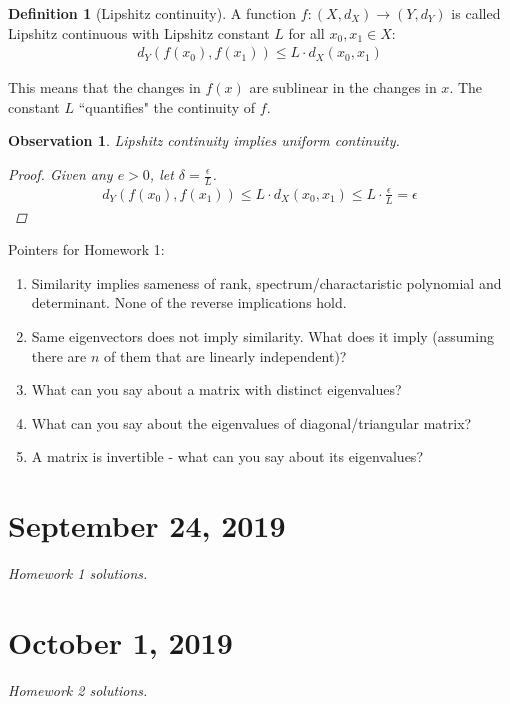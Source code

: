 \documentclass[11pt]{article}
\newcommand{\e}{\epsilon}
\theoremstyle{plain}
\newtheorem{obs}{Observation}[section]
\theoremstyle{definition}
\newtheorem{defi}{Definition}[section]
\theoremstyle{remark}
\begin{document}
\begin{defi}[Lipshitz continuity]
    A function $f: (X,d_X) \rightarrow (Y, d_Y)$ is called Lipshitz continuous with Lipshitz constant $L$ for all $x_0, x_1 \in X$:
    \begin{align*}
        d_Y(f(x_0), f(x_1)) \leq L \cdot d_X(x_0, x_1)
    \end{align*}
\end{defi}
This means that the changes in $f(x)$ are sublinear in the changes in $x$. The constant $L$ ``quantifies" the continuity of $f$. 
\begin{obs}
    Lipshitz continuity implies uniform continuity.
    \begin{proof}
        Given any $e > 0$, let $\delta = \frac{\e}{L}$.
        \begin{align*}
            d_Y(f(x_0), f(x_1)) \leq L \cdot d_X(x_0, x_1) \leq L \cdot \frac{\e}{L} = \e
        \end{align*}
    \end{proof}
\end{obs}

Pointers for Homework 1:
\begin{enumerate}
        \item Similarity implies sameness of rank, spectrum/charactaristic polynomial and determinant. None of the reverse implications hold.
        \item Same eigenvectors does not imply similarity. What does it imply (assuming there are $n$ of them that are linearly independent)?
        \item What can you say about a matrix with distinct eigenvalues?
        \item What can you say about the eigenvalues of diagonal/triangular matrix?
        \item A matrix is invertible - what can you say about its eigenvalues?
\end{enumerate}

\section{September 24, 2019}

{\it Homework 1 solutions.}

\section{October 1, 2019}

{\it Homework 2 solutions.}
\end{document}
